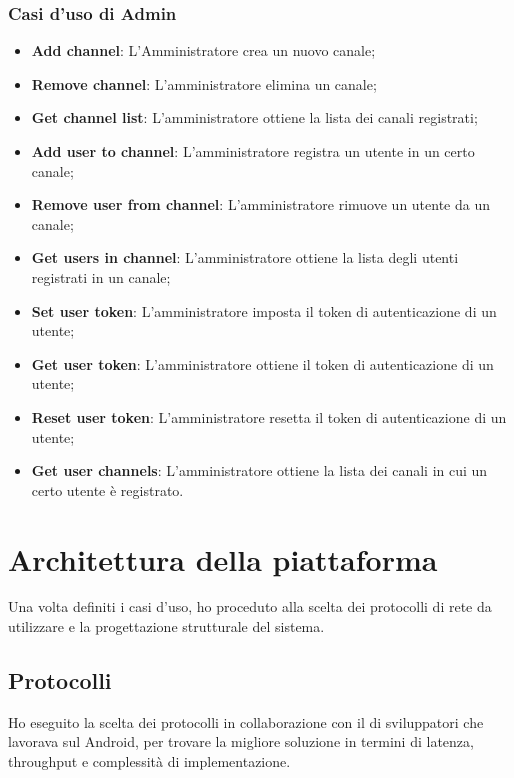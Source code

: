 		\subsubsection{Casi d'uso di Admin}
		\begin{itemize}
			\item \textbf{Add channel}: L'Amministratore crea un nuovo canale;
			\item \textbf{Remove channel}: L'amministratore elimina un canale;
			\item \textbf{Get channel list}: L'amministratore ottiene la lista dei canali registrati;
			\item \textbf{Add user to channel}: L'amministratore registra un utente in un certo canale;
			\item \textbf{Remove user from channel}: L'amministratore rimuove un utente da un canale;
			\item \textbf{Get users in channel}: L'amministratore ottiene la lista degli utenti registrati in un canale;
			\item \textbf{Set user token}: L'amministratore imposta il token di autenticazione di un utente;
			\item \textbf{Get user token}: L'amministratore ottiene il token di autenticazione di un utente;
			\item \textbf{Reset user token}: L'amministratore resetta il token di autenticazione di un utente;
			\item \textbf{Get user channels}: L'amministratore ottiene la lista dei canali in cui un certo utente è registrato.
		\end{itemize}
		

\section{Architettura della piattaforma}
Una volta definiti i casi d'uso, ho proceduto alla scelta dei protocolli di rete da utilizzare e la progettazione strutturale del sistema.
	\subsection{Protocolli}
	Ho eseguito la scelta dei protocolli in collaborazione con il  di sviluppatori che lavorava sul  Android, per trovare la migliore soluzione in termini di latenza, throughput e complessità di implementazione.
